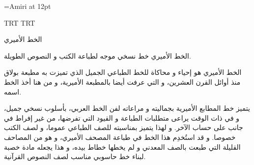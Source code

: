 \documentclass{article}
\begin{document}
\font\amiri={Amiri} at 12pt
\amiri
\startharfbuzz


\luatextextdir TRT
\luatexpardir TRT

الخط الأميري

الخط الأميري خط نسخي موجه لطباعة الكتب و النصوص الطويلة.

الخط الأميري هو إحياء و محاكاة للخط الطباعي الجميل الذي تميزت به مطبعة بولاق منذ أوائل القرن العشرين، و التي عرفت أيضا بالمطبعة الأميرية، و من هنا أخذ الخط اسمه.

يتميز خط المطابع الأميرية بجماليته و مراعاته لفن الخط العربي، بأسلوب نسخي جميل، و في ذات الوقت يراعى متطلبات الطباعة و القيود التي تفرضها، من غير إفراط في جانب على حساب الآخر. و لهذا يتميز بمناسبته للصف الطباعي عموما، و لصف الكتب خصوصا. و قد استُخدِم هذا الخط في طباعة المصحف الأميري، و هو من المصاحف القليلة التي طبعت بالصف المعدني و لم يخطها خطاط بيده، و هذا يجعله مادة خصبة لبناء خط حاسوبي مناسب لصف النصوص القرآنية.
\end{document}
